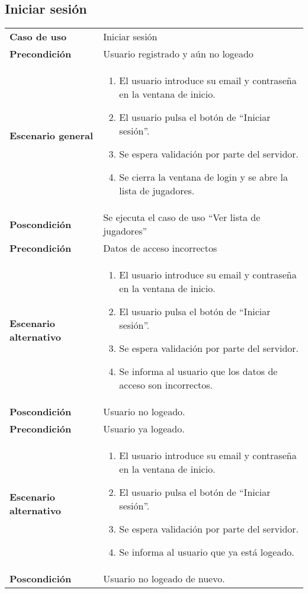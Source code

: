 \subsection{Iniciar sesión}

{\footnotesize
\begin{tabularx}{0.95\textwidth}{p{}|X}

\textbf{Caso de uso} & Iniciar sesión \\

\textbf{Precondición} & Usuario registrado y aún no logeado \\

\textbf{Escenario general} & \begin{enumerate}
\item El usuario introduce su email y contraseña en la ventana de inicio.
\item El usuario pulsa el botón de ``Iniciar sesión''.
\item Se espera validación por parte del servidor.
\item Se cierra la ventana de login y se abre la lista de jugadores.
\end{enumerate} \\

\textbf{Poscondición} & Se ejecuta el caso de uso ``Ver lista de jugadores''
\\

\textbf{Precondición} & Datos de acceso incorrectos\\
\textbf{Escenario alternativo} & \begin{enumerate}
\item El usuario introduce su email y contraseña en la ventana de inicio.
\item El usuario pulsa el botón de ``Iniciar sesión''.
\item Se espera validación por parte del servidor.
\item Se informa al usuario que los datos de acceso son incorrectos.
\end{enumerate}\\
\textbf{Poscondición} &Usuario no logeado.\\

\textbf{Precondición} & Usuario ya logeado.\\
\textbf{Escenario alternativo}& \begin {enumerate}
\item El usuario introduce su email y contraseña en la ventana de inicio.
\item El usuario pulsa el botón de ``Iniciar sesión''.
\item Se espera validación por parte del servidor.
\item Se informa al usuario que ya está logeado.
\end{enumerate}\\
\textbf{Poscondición}& Usuario no logeado de nuevo.\\
\end{tabularx}
}

